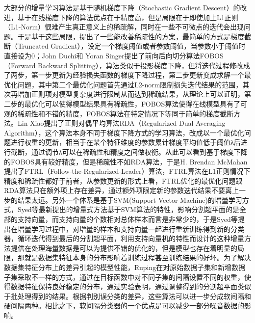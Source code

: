 大部分的增量学习算法是基于随机梯度下降（Stochastic Gradient Descent）的改进\cite{hazan2007logarithmic, xiao2010dual, mcmahan2011follow}，基于在线梯度下降的算法优点在于精度高，但是局限在于即使加上L1正则（L1-Norm）很难产生真正意义上的稀疏解，同时在一些不可微点的迭代会出现问题。于是基于这些局限，提出了一些能改善稀疏性的方案，最简单的方式是梯度截断（Truncated Gradient），设定一个梯度阈值或者参数阈值，当参数小于阈值时直接设为0\cite{langford2009sparse}；John Duchi和 Yoran Singer\cite{duchi2009efficient}提出了前向后向切分算法FOBOS（Forward Backward Splitting），算法类似于投影梯度下降，但将迭代过程修改成了两步，第一步更新为经验损失函数的梯度下降过程，第二步更新变成求解一个最优化问题，其中第二个最优化问题首先通过L2-norm限制损失迭代结果的范围，其次再增加正则项对模型复杂度进行限制从而达到稀疏结果，从理论上可以证明，第二步的最优化可以使得模型结果具有稀疏性，FOBOS算法使得在线模型具有了可观的稀疏性和不错的精度，FOBOS算法在特定情况下等同于简单的梯度截断方法。Lin Xiao\cite{xiao2010dual}提出了正则对偶平均算法RDA（Regularized Dual Averaging Algorithm），这个算法本身不同于梯度下降方式的学习算法，改成以一个最优化问题进行权重的更新，相当于在某个特征维度的参数累计梯度平均值低于阈值λ后进行截断，通过调节λ可以在稀疏性和精度之间做权衡。从此可以看到基于梯度下降的FOBOS具有较好精度，但是稀疏性不如RDA算法，于是H. Brendan McMahan提出了FTRL（Follow-the-Regularized-Leader）算法\cite{mcmahan2011follow}，FTRL算法在L1正则情况下精度和稀疏性都好于前者，从参数更新的形式上看，FTRL优化的最优化问题跟RDA算法只在额外项上存在差异，通过额外项限定新的参数迭代结果不要离上一步的结果太远。另外一个体系是基于SVM(Support Vector Machine)的增量学习方式，Syed等\cite{syed1999incremental}最新提出的增量式方法基于SVM算法的特性，影响分割超平面的是全部的支持向量，而支持向量的个数相对总体样本而言是非常少的，于是Syed等提出在增量学习过程中，对增量的样本和支持向量一起进行重新训练得到新的分类器，循环迭代得到最后的分割超平面，利用支持向量机的特性而设计的这种增量方法提供在处理海量数据是可以为提供不错的优化的，但是模型也存在着明显的局限，那就是数据集特征本身的分布影响着训练过程甚至训练结果的好坏。为了解决数据集特征分布上的差异引起的模型性能，Ruping\cite{ruping2001incremental}在对原始数据子集和新增数据子集采取不一样的方式，通过在目标函数中对不同子集的间隔设置不同的权重，使得数据特征保持良好稳定的分布，通过实验表明，通过调整得到的分割超平面类似于批处理得到的结果。根据判别误分类的差异，这些算法可以进一步分成软间隔和硬间隔两种。相比之下，软间隔分类器的一个优点是可以减少一部分噪音数据的影响\cite{kivinen2002large}。

